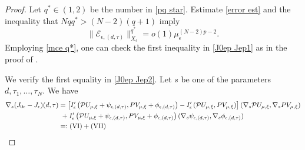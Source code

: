 \documentclass[reqno]{amsart}
\theoremstyle{remark}
\newcommand{\ep}{\epsilon}
\newcommand{\mce}{\mathcal{E}}
\newcommand{\mcp}{\mathcal{P}}
\newcommand{\mx}{{\mu,\xi}}
\renewcommand{\(}{\left(}
\renewcommand{\)}{\right)}
\numberwithin{equation}{section}
\begin{document}
\begin{proof}
Let $q^* \in (1,2)$ be the number in \eqref{pq star}. Estimate \eqref{error est} and the inequality that $Nqq^* > (N-2)(q+1)$ imply
\begin{equation}\label{mce q*}
\|\mce_{\ep,(d,\tau)}\|_{X_\ep}^{q^*} = o(1)\mu_\ep^{(N-2)p-2}.
\end{equation}
Employing \eqref{mce q*}, one can check the first inequality in \eqref{J0ep Jep1} as in the proof of \cite[Lemma 5.4]{KP}.

\medskip
We verify the first equality in \eqref{J0ep Jep2}. Let $s$ be one of the parameters $d,\tau_1,\ldots,\tau_N$. We have
\begin{align*}
\nabla_s(J_{0\ep}-J_{\ep})(d,\tau) &= \left[I'_\ep\(\mcp U_\mx+\psi_{\ep,(d,\tau)}, PV_\mx+\phi_{\ep,(d,\tau)}\) - I'_\ep\(\mcp U_\mx, PV_\mx\)\right](\nabla_s\mcp U_\mx,\nabla_sPV_\mx) \\
&\ + I'_\ep\(\mcp U_\mx+\psi_{\ep,(d,\tau)}, PV_\mx+\phi_{\ep,(d,\tau)}\)(\nabla_s\psi_{\ep,(d,\tau)},\nabla_s\phi_{\ep,(d,\tau)})\\
&=: \textup{(VI)} + \textup{(VII)}
\end{align*}


\end{proof}
\end{document}

